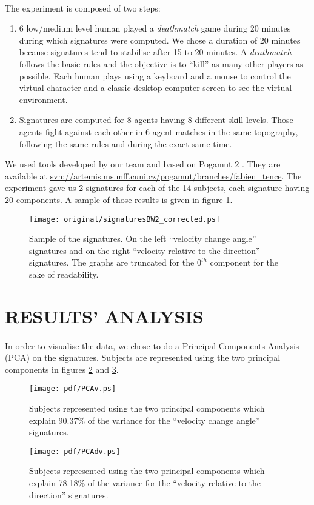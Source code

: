 \documentclass[a4paper,twocolumn]{article}
\begin{document}
\paragraph{}%
The experiment is composed of two steps:
\begin{enumerate}
 \item 6 low/medium level human played a \emph{deathmatch} game during 20 minutes during which signatures were computed. We chose a duration of 20 minutes because signatures tend to stabilise after 15 to 20 minutes. A \emph{deathmatch} follows the basic rules and the objective is to ``kill'' as many other players as possible. Each human plays using a keyboard and a mouse to control the virtual character and a classic desktop computer screen to see the virtual environment.
 \item Signatures are computed for 8 agents having 8 different skill levels. Those agents fight against each other in 6-agent matches in the same topography, following the same rules and during the exact same time.
\end{enumerate}
We used tools developed by our team and based on Pogamut 2 \cite{Burkert2007}. They are available at \url{svn://artemis.ms.mff.cuni.cz/pogamut/branches/fabien_tence}. The experiment gave us 2 signatures for each of the 14 subjects, each signature having 20 components. A sample of those results is given in figure \ref{signatures}.
\begin{figure}[!ht]
	\centering
	\texttt{[image: original/signaturesBW2\_corrected.ps]}
	\caption{Sample of the signatures. On the left ``velocity change angle'' signatures and on the right  ``velocity relative to the direction'' signatures. The graphs are truncated for the $0^{th}$ component for the sake of readability.}
	\label{signatures}
\end{figure}
\section{RESULTS' ANALYSIS}
\paragraph{}%
In order to visualise the data, we chose to do a Principal Components Analysis (PCA) on the signatures. Subjects are represented using the two principal components in figures \ref{PCAv} and \ref{PCAdv}.
\begin{figure}[!ht]
	\texttt{[image: pdf/PCAv.ps]}
	\caption{Subjects represented using the two principal components which explain 90.37\% of the variance for the ``velocity change angle'' signatures.}
	\label{PCAv}
\end{figure}
\begin{figure}[!ht]
	\texttt{[image: pdf/PCAdv.ps]}
	\caption{Subjects represented using the two principal components which explain 78.18\% of the variance for the ``velocity relative to the direction'' signatures.}
	\label{PCAdv}
\end{figure}
\end{document}
